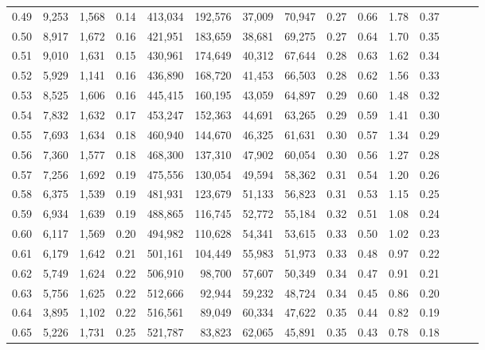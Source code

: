 \begin{tabular}{rrrrrrrrrrrrrrr}
0.49 &   9,253 &  1,568 &  0.14 &  413,034 &  192,576 &   37,009 &   70,947 &  0.27 &  0.66 &  1.78 &      0.37 \\
0.50 &   8,917 &  1,672 &  0.16 &  421,951 &  183,659 &   38,681 &   69,275 &  0.27 &  0.64 &  1.70 &      0.35 \\
0.51 &   9,010 &  1,631 &  0.15 &  430,961 &  174,649 &   40,312 &   67,644 &  0.28 &  0.63 &  1.62 &      0.34 \\
0.52 &   5,929 &  1,141 &  0.16 &  436,890 &  168,720 &   41,453 &   66,503 &  0.28 &  0.62 &  1.56 &      0.33 \\
0.53 &   8,525 &  1,606 &  0.16 &  445,415 &  160,195 &   43,059 &   64,897 &  0.29 &  0.60 &  1.48 &      0.32 \\
0.54 &   7,832 &  1,632 &  0.17 &  453,247 &  152,363 &   44,691 &   63,265 &  0.29 &  0.59 &  1.41 &      0.30 \\
0.55 &   7,693 &  1,634 &  0.18 &  460,940 &  144,670 &   46,325 &   61,631 &  0.30 &  0.57 &  1.34 &      0.29 \\
0.56 &   7,360 &  1,577 &  0.18 &  468,300 &  137,310 &   47,902 &   60,054 &  0.30 &  0.56 &  1.27 &      0.28 \\
0.57 &   7,256 &  1,692 &  0.19 &  475,556 &  130,054 &   49,594 &   58,362 &  0.31 &  0.54 &  1.20 &      0.26 \\
0.58 &   6,375 &  1,539 &  0.19 &  481,931 &  123,679 &   51,133 &   56,823 &  0.31 &  0.53 &  1.15 &      0.25 \\
0.59 &   6,934 &  1,639 &  0.19 &  488,865 &  116,745 &   52,772 &   55,184 &  0.32 &  0.51 &  1.08 &      0.24 \\
0.60 &   6,117 &  1,569 &  0.20 &  494,982 &  110,628 &   54,341 &   53,615 &  0.33 &  0.50 &  1.02 &      0.23 \\
0.61 &   6,179 &  1,642 &  0.21 &  501,161 &  104,449 &   55,983 &   51,973 &  0.33 &  0.48 &  0.97 &      0.22 \\
0.62 &   5,749 &  1,624 &  0.22 &  506,910 &   98,700 &   57,607 &   50,349 &  0.34 &  0.47 &  0.91 &      0.21 \\
0.63 &   5,756 &  1,625 &  0.22 &  512,666 &   92,944 &   59,232 &   48,724 &  0.34 &  0.45 &  0.86 &      0.20 \\
0.64 &   3,895 &  1,102 &  0.22 &  516,561 &   89,049 &   60,334 &   47,622 &  0.35 &  0.44 &  0.82 &      0.19 \\
0.65 &   5,226 &  1,731 &  0.25 &  521,787 &   83,823 &   62,065 &   45,891 &  0.35 &  0.43 &  0.78 &      0.18 \\

\end{tabular}
